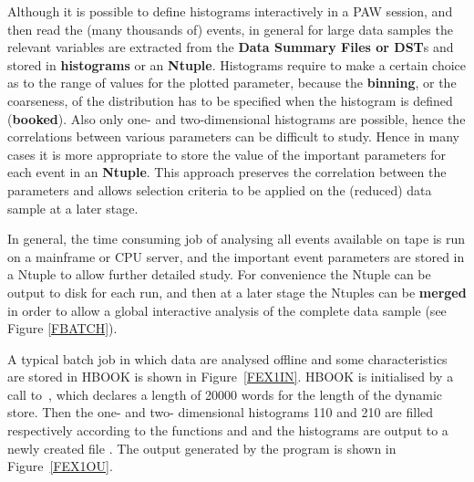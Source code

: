 Although it is possible to define histograms interactively in a PAW
session, and then read the (many thousands of) events, in general
for large data samples the relevant variables are extracted from
the {\bf Data Summary Files {\rm or} DST}s
and stored in {\bf histograms}
or an {\bf Ntuple}.
Histograms require to make a certain choice 
as to the range of values for the plotted parameter, because the
{\bf binning}, or the coarseness, of the distribution has to
be specified when the histogram is defined ({\bf booked}).
Also only one- and two-dimensional histograms are possible, hence the
correlations between various parameters can be difficult to study.
Hence in many cases it is more appropriate to store the value of
the important parameters for each event in an {\bf Ntuple}.
This approach preserves the correlation between the parameters
and allows selection criteria to be applied on the (reduced)
data sample at a later stage.

In general, the time consuming job of
analysing all events available on tape is run on a mainframe or CPU 
server, and
the important event parameters are stored in a Ntuple
to allow further detailed study. For convenience the Ntuple
can be output to disk for each run, and then at a later stage the
Ntuples can be {\bf merged} in order to allow a global
interactive analysis of the complete data sample (see Figure \ref{FBATCH}).


A typical batch job in which data are analysed offline and
some characteristics are stored in HBOOK is shown in Figure~\ref{FEX1IN}.
HBOOK is initialised by a call to~, 
which declares a length of 20000 words for the
length of the  dynamic store. Then the one- and two-
dimensional histograms 110 and 210 are filled respectively
according to the functions  and 
and the histograms are output to a newly created file .
The output generated by the program is shown in Figure~\ref{FEX1OU}.

